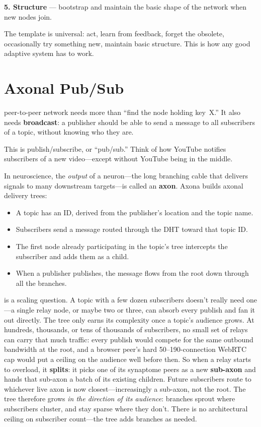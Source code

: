 \documentclass[nobib]{tufte-handout}
\begin{document}
\textbf{5. Structure} --- bootstrap and maintain the basic shape of the network when new nodes join.

The template is universal: act, learn from feedback, forget the obsolete, occasionally try something new, maintain basic structure. This is how any good adaptive system has to work.

\section{Axonal Pub/Sub}

 peer-to-peer network needs more than ``find the node holding key~X.'' It also needs \textbf{broadcast}: a publisher should be able to send a message to all subscribers of a topic, without knowing who they are.

This is publish/subscribe, or ``pub/sub.'' Think of how YouTube notifies subscribers of a new video---except without YouTube being in the middle.

In neuroscience, the \emph{output} of a neuron---the long branching cable that delivers signals to many downstream targets---is called an \textbf{axon}. Axona builds axonal delivery trees:

\begin{itemize}
  \item A topic has an ID, derived from the publisher's location and the topic name.
  \item Subscribers send a message routed through the DHT toward that topic ID.
  \item The first node already participating in the topic's tree intercepts the subscriber and adds them as a child.
  \item When a publisher publishes, the message flows from the root down through all the branches.
\end{itemize}

 is a scaling question. A topic with a few dozen subscribers doesn't really need one---a single relay node, or maybe two or three, can absorb every publish and fan it out directly. The tree only earns its complexity once a topic's audience grows. At hundreds, thousands, or tens of thousands of subscribers, no small set of relays can carry that much traffic: every publish would compete for the same outbound bandwidth at the root, and a browser peer's hard 50--190-connection WebRTC cap would put a ceiling on the audience well before then. So when a relay starts to overload, it \textbf{splits}: it picks one of its synaptome peers as a new \textbf{sub-axon} and hands that sub-axon a batch of its existing children. Future subscribers route to whichever live axon is now closest---increasingly a sub-axon, not the root. The tree therefore grows \emph{in the direction of its audience}: branches sprout where subscribers cluster, and stay sparse where they don't. There is no architectural ceiling on subscriber count---the tree adds branches as needed.
\end{document}
